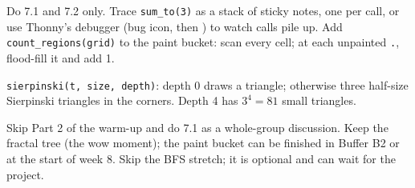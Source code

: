 \begin{differentiation}
\supportpath Do 7.1 and 7.2 only. Trace \texttt{sum\_to(3)} as a stack of sticky notes, one per call, or use Thonny's debugger (bug icon, then ) to watch calls pile up.
\extensionpath Add \texttt{count\_regions(grid)} to the paint bucket: scan every cell; at each unpainted \texttt{.}, flood-fill it and add 1.
\end{differentiation}

\begin{stretchchallenge}
\texttt{sierpinski(t, size, depth)}: depth 0 draws a triangle; otherwise three half-size Sierpinski triangles in the corners. Depth 4 has $3^4 = 81$ small triangles.
\end{stretchchallenge}

\begin{teachernote}
Skip Part 2 of the warm-up and do 7.1 as a whole-group discussion. Keep the fractal tree (the wow moment); the paint bucket can be finished in Buffer B2 or at the start of week 8. Skip the BFS stretch; it is optional and can wait for the project.
\end{teachernote}
